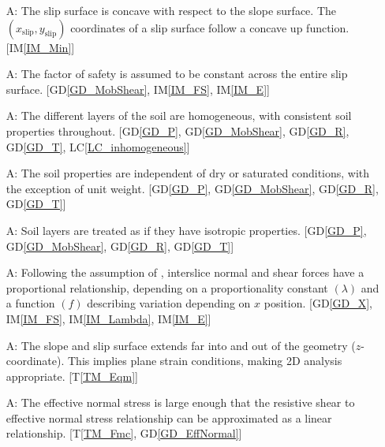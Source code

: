 \documentclass[12pt]{article}
\newcounter{assumpnum} %
\newcommand{\tref}[1]{T\ref{#1}}
\newcommand{\iref}[1]{IM\ref{#1}}
\newcommand{\dref}[1]{GD\ref{#1}}
\newcommand{\lcref}[1]{LC\ref{#1}}
\begin{document}
\begin{enumerate}[label=A\arabic*:,ref={\arabic*}]
\item [A\refstepcounter{assumpnum}\theassumpnum: \label{A_Concave}] The
  slip surface is concave with respect to the slope surface. The 
  $(x_{\text{slip}},y_{\text{slip}})$ coordinates of a slip surface follow a 
  concave up 
  function. [\iref{IM_Min}]

\item [A\refstepcounter{assumpnum}\theassumpnum: \label{A_Constant}] The factor 
of safety is assumed to be constant across the entire slip surface. 
[\dref{GD_MobShear}, \iref{IM_FS}, \iref{IM_E}]

\item [A\refstepcounter{assumpnum}\theassumpnum: \label{A_Homo}] The
  different layers of the soil are homogeneous, with consistent soil
  properties throughout. [\dref{GD_P}, \dref{GD_MobShear}, \dref{GD_R}, 
  \dref{GD_T}, \lcref{LC_inhomogeneous}]
  
\item [A\refstepcounter{assumpnum}\theassumpnum: \label{A_Saturated}] The soil 
properties are independent of dry or saturated conditions, with the exception 
of unit weight. [\dref{GD_P}, \dref{GD_MobShear}, \dref{GD_R}, 
\dref{GD_T}]

\item [A\refstepcounter{assumpnum}\theassumpnum: \label{A_Isotropic}]
  Soil layers are treated as if they have isotropic properties. [\dref{GD_P}, 
  \dref{GD_MobShear}, \dref{GD_R}, \dref{GD_T}]
  
\item [A\refstepcounter{assumpnum}\theassumpnum: \label{A_Base}]
  Following the assumption of \cite{MorgPrice}, interslice normal and shear 
  forces have a proportional relationship, depending on a proportionality 
  constant $\left({\lambda}\right)$ and a function $\left({f}\right)$ 
  describing variation depending on $x$ position. [\dref{GD_X}, \iref{IM_FS}, 
  \iref{IM_Lambda}, \iref{IM_E}]
  
\item [A\refstepcounter{assumpnum}\theassumpnum: \label{A_2D}] The
  slope and slip surface extends far into and out of the geometry 
  ($z$-coordinate). This implies plane strain conditions, making 2D
  analysis appropriate. [\tref{TM_Eqm}]

\item [A\refstepcounter{assumpnum}\theassumpnum: \label{A_Lin}] The
  effective normal stress is large enough that the resistive shear to
  effective normal stress relationship can be approximated as a linear
  relationship. [\tref{TM_Fmc}, \dref{GD_EffNormal}]


\end{enumerate}
\end{document}
